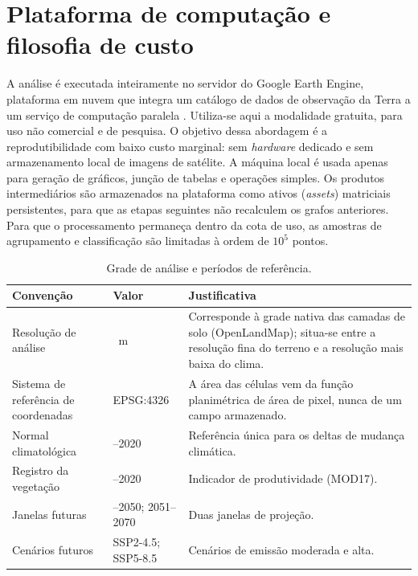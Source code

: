 \section{Plataforma de computação e filosofia de custo}\label{sec:cost}

A análise é executada inteiramente no servidor do Google Earth Engine, plataforma em nuvem que
integra um catálogo de dados de observação da Terra a um serviço de computação paralela
\citep[pp.~18--19]{gorelick_google_2017}. Utiliza-se aqui a modalidade gratuita, para uso não comercial e
de pesquisa. O objetivo dessa abordagem é a reprodutibilidade com baixo custo marginal: sem
\emph{hardware} dedicado e sem armazenamento local de imagens de satélite. A máquina local é usada apenas
para geração de gráficos, junção de tabelas e operações simples. Os produtos intermediários são
armazenados na plataforma como ativos (\emph{assets}) matriciais persistentes, para que as etapas
seguintes não recalculem os grafos anteriores. Para que o processamento permaneça dentro da cota de
uso, as amostras de agrupamento e classificação são limitadas à ordem de $10^5$ pontos.

\begin{table}[htbp]
\centering
\caption{Grade de análise e períodos de referência.}\label{tab:grid-periods}
\begin{tabular}{@{}>{\raggedright\arraybackslash}p{3.2cm}>{\raggedright\arraybackslash}p{3.8cm}>{\raggedright\arraybackslash}p{6.3cm}@{}}
\toprule
Convenção & Valor & Justificativa \\
\midrule
Resolução de análise & 250~m & Corresponde à grade nativa das camadas de solo (OpenLandMap); situa-se entre a resolução fina do terreno e a resolução mais baixa do clima. \\
Sistema de referência de coordenadas & EPSG:4326 & A área das células vem da função planimétrica de área de pixel, nunca de um campo armazenado. \\
Normal climatológica & 1991--2020 & Referência única para os deltas de mudança climática. \\
Registro da vegetação & 2001--2020 & Indicador de produtividade (MOD17). \\
Janelas futuras & 2031--2050; 2051--2070 & Duas janelas de projeção. \\
Cenários futuros & SSP2-4.5; SSP5-8.5 & Cenários de emissão moderada e alta. \\
\bottomrule
\end{tabular}
\end{table}


